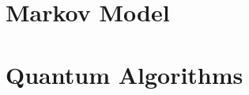





\newpage
%		
		
		
		
\newpage

\section{Markov Model}
		
		
		
		
%		

%		
		
		
\section{Quantum Algorithms}
		
		
		
















